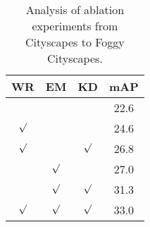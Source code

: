 \documentclass[sn-mathphys]{sn-jnl}%
\theoremstyle{thmstyleone}%
\theoremstyle{thmstyletwo}%
\theoremstyle{thmstylethree}%
\begin{document}
\begin{table}[]
	\caption{Analysis of ablation experiments from Cityscapes to Foggy Cityscapes.}
	\centering
	\setlength{\tabcolsep}{5mm}
	\begin{tabular}{c|c|c|c}
		\hline
		WR  	&EM 	&KD 	&mAP                      \\ \hline
		
		\multicolumn{1}{c|}{} & \multicolumn{1}{c|}{}& \multicolumn{1}{c|}{} & \multicolumn{1}{c}{22.6} \\ \hline
		
		\multicolumn{1}{c|}{$\surd$} & \multicolumn{1}{c|}{}  & \multicolumn{1}{c|}{}  & \multicolumn{1}{c}{24.6}  \\ \hline
		
		\multicolumn{1}{c|}{$\surd$} & \multicolumn{1}{c|}{}  & \multicolumn{1}{c|}{$\surd$} & \multicolumn{1}{c}{26.8} \\ \hline
		
		\multicolumn{1}{c|}{} & \multicolumn{1}{c|}{$\surd$}& \multicolumn{1}{c|}{}& \multicolumn{1}{c}{27.0} \\ \hline
		
		\multicolumn{1}{c|}{} & \multicolumn{1}{c|}{$\surd$}& \multicolumn{1}{c|}{$\surd$}& \multicolumn{1}{c}{31.3} \\ \hline
		
		\multicolumn{1}{c|}{$\surd$} & \multicolumn{1}{c|}{$\surd$}& \multicolumn{1}{c|}{$\surd$}& \multicolumn{1}{c}{33.0} \\ \hline		
	\end{tabular}
	\label{table:4}
\end{table}



%
%
\end{document}
